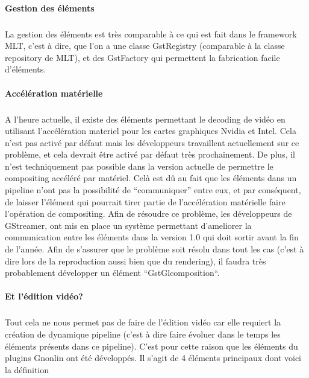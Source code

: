 \paragraph{Gestion des éléments}

\subparagraph{}

La gestion des éléments est très comparable à ce qui est fait dans le
framework MLT, c'est à dire, que l'on a une classe GstRegistry
(comparable à la classe repository de MLT), et des GstFactory
qui permettent la fabrication facile d'éléments.

\paragraph{Accélération matérielle}

\subparagraph{}

A l'heure actuelle, il existe des éléments permettant le decoding de
vidéo en utilisant l'accélération materiel pour les cartes graphiques
Nvidia et Intel. Cela n'est pas activé par défaut mais les développeurs
travaillent actuellement sur ce problème, et cela devrait être activé
par défaut très prochainement. De plus, il n'est techniquement
pas possible dans la version actuelle de permettre le compositing
accéléré par matériel. Celà est dû au fait que les éléments
dans un pipeline n'ont pas la possibilité de ``communiquer'' entre eux,
et par conséquent, de laisser l'élément qui pourrait tirer partie de
l'accélération matérielle faire l'opération de compositing. Afin de
résoudre ce problème, les développeurs de GStreamer, ont mis en place
un système permettant d'ameliorer la communication entre les éléments
dans la version 1.0 qui doit sortir avant la fin de l'année. Afin de
s'assurer que le problème soit résolu dans tout les cas (c'est à dire
lors de la reproduction aussi bien que du rendering), il faudra très
probablement développer un élément ``GstGlcomposition``.

\paragraph{Et l'édition vidéo?}

\subparagraph{}

Tout cela ne nous permet pas de faire de l'édition vidéo car elle
requiert la création de dynamique pipeline (c'est à dire faire évoluer
dans le temps les éléments présents dans ce pipeline). C'est pour cette
raison que les éléments du plugins Gnonlin ont été développés. Il
s'agit de 4 éléments principaux dont voici la définition


